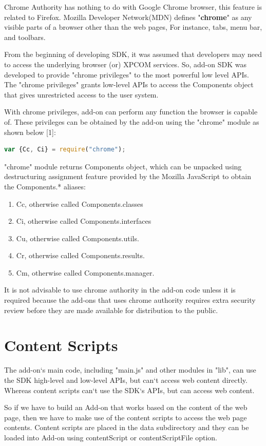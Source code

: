 Chrome Authority has nothing to do with Google Chrome browser, this feature is related to Firefox. Mozilla Developer Network(MDN) defines "\textbf{chrome}" as any visible parts of a browser other than the web pages, For instance, tabs, menu bar, and toolbars.

From the beginning of developing SDK, it was assumed that developers may need to access the underlying browser (or) XPCOM services. So, add-on SDK was developed to provide "chrome privileges" to the most powerful low level APIs. The "chrome privileges" grants low-level APIs to access the Components object that gives unrestricted access to the user system.  

With chrome privileges, add-on can perform any function the browser is capable of. These privileges can be obtained by the add-on using the "chrome" module as shown below [1]:
\begin{lstlisting}[frame=single,language=JavaScript,numbers=none,mathescape=false]
var {Cc, Ci} = require("chrome");
\end{lstlisting}
"chrome" module returns Components object, which can be unpacked using destructuring assignment feature provided by the Mozilla JavaScript to obtain the Components.* aliases: 
\begin{enumerate}
\item Cc, otherwise called Components.classes
\item Ci, otherwise called Components.interfaces
\item Cu, otherwise called Components.utils.
\item Cr, otherwise called Components.results.
\item Cm, otherwise called Components.manager.
\end{enumerate}
It is not advisable to use chrome authority in the add-on code unless it is required because the add-ons that uses chrome authority requires extra security review before they are made available for distribution to the public.

\section{Content Scripts}

The add-on`s main code, including "main.js" and other modules in "lib", can use the SDK high-level and low-level APIs, but can`t access web content directly. Whereas content scripts can`t use the SDK`s APIs, but can access web content.

So if we have to build an Add-on that works based on the content of the web page, then we have to make use of the content scripts to access the web page contents. Content scripts are placed in the data subdirectory and they can be loaded into Add-on using contentScript or contentScriptFile option.

